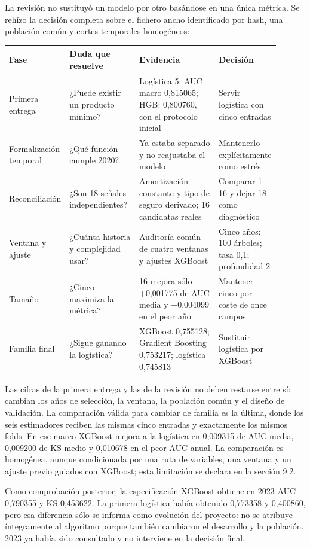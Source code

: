\documentclass[10pt,a4paper]{article}
\begin{document}
La revisión no sustituyó un modelo por otro basándose en una única métrica. Se
rehízo la decisión completa sobre el fichero ancho identificado por hash, una
población común y cortes temporales homogéneos:

\begin{center}\small
\setlength{\tabcolsep}{3pt}
\begin{tabular}{p{0.16\linewidth} p{0.26\linewidth} p{0.31\linewidth} p{0.17\linewidth}}
\textbf{Fase} & \textbf{Duda que resuelve} & \textbf{Evidencia} & \textbf{Decisión}\\ \hline
Primera entrega & ¿Puede existir un producto mínimo? & Logística 5: AUC macro 0,815065; HGB: 0,800760, con el protocolo inicial & Servir logística con cinco entradas\\
Formalización temporal & ¿Qué función cumple 2020? & Ya estaba separado y no reajustaba el modelo & Mantenerlo explícitamente como estrés\\
Reconciliación & ¿Son 18 señales independientes? & Amortización constante y tipo de seguro derivado; 16 candidatas reales & Comparar 1--16 y dejar 18 como diagnóstico\\
Ventana y ajuste & ¿Cuánta historia y complejidad usar? & Auditoría común de cuatro ventanas y ajustes XGBoost & Cinco años; 100 árboles; tasa 0,1; profundidad 2\\
Tamaño & ¿Cinco maximiza la métrica? & 16 mejora sólo +0,001775 de AUC media y +0,004099 en el peor año & Mantener cinco por coste de once campos\\
Familia final & ¿Sigue ganando la logística? & XGBoost 0,755128; Gradient Boosting 0,753217; logística 0,745813 & Sustituir logística por XGBoost\\
\end{tabular}
\end{center}

Las cifras de la primera entrega y las de la revisión no deben restarse entre
sí: cambian los años de selección, la ventana, la población común y el diseño de
validación. La comparación válida para cambiar de familia es la última, donde
los seis estimadores reciben las mismas cinco entradas y exactamente los mismos
folds. En ese marco XGBoost mejora a la logística en 0,009315 de AUC media,
0,009200 de KS medio y 0,010678 en el peor AUC anual.
La comparación es homogénea, aunque condicionada por una ruta de variables, una
ventana y un ajuste previo guiados con XGBoost; esta limitación se declara en la
sección 9.2.

Como comprobación posterior, la especificación XGBoost obtiene en 2023 AUC
0,790355 y KS 0,453622. La primera logística había obtenido 0,773358 y 0,400860,
pero esa diferencia sólo se informa como evolución del proyecto: no se atribuye
íntegramente al algoritmo porque también cambiaron el desarrollo y la población.
2023 ya había sido consultado y no interviene en la decisión final.
\end{document}
